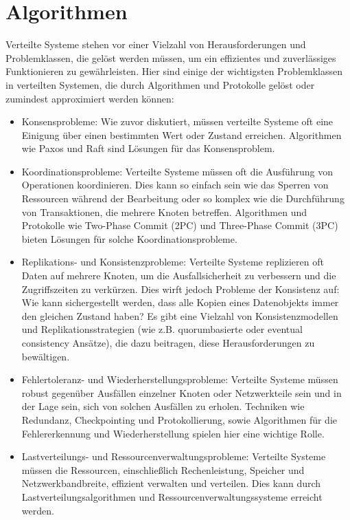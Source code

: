 \section{Algorithmen}

Verteilte Systeme stehen vor einer Vielzahl von Herausforderungen und Problemklassen, die gelöst werden müssen, um ein effizientes und zuverlässiges Funktionieren zu gewährleisten. Hier sind einige der wichtigsten Problemklassen in verteilten Systemen, die durch Algorithmen und Protokolle gelöst oder zumindest approximiert werden können:
\begin{itemize}
\item Konsensprobleme: Wie zuvor diskutiert, müssen verteilte Systeme oft eine Einigung über einen bestimmten Wert oder Zustand erreichen. Algorithmen wie Paxos und Raft sind Lösungen für das Konsensproblem.

\item Koordinationsprobleme: Verteilte Systeme müssen oft die Ausführung von Operationen koordinieren. Dies kann so einfach sein wie das Sperren von Ressourcen während der Bearbeitung oder so komplex wie die Durchführung von Transaktionen, die mehrere Knoten betreffen. Algorithmen und Protokolle wie Two-Phase Commit (2PC) und Three-Phase Commit (3PC) bieten Lösungen für solche Koordinationsprobleme.

\item Replikations- und Konsistenzprobleme: Verteilte Systeme replizieren oft Daten auf mehrere Knoten, um die Ausfallsicherheit zu verbessern und die Zugriffszeiten zu verkürzen. Dies wirft jedoch Probleme der Konsistenz auf: Wie kann sichergestellt werden, dass alle Kopien eines Datenobjekts immer den gleichen Zustand haben? Es gibt eine Vielzahl von Konsistenzmodellen und Replikationsstrategien (wie z.B. quorumbasierte oder eventual consistency Ansätze), die dazu beitragen, diese Herausforderungen zu bewältigen.

\item Fehlertoleranz- und Wiederherstellungsprobleme: Verteilte Systeme müssen robust gegenüber Ausfällen einzelner Knoten oder Netzwerkteile sein und in der Lage sein, sich von solchen Ausfällen zu erholen. Techniken wie Redundanz, Checkpointing und Protokollierung, sowie Algorithmen für die Fehlererkennung und Wiederherstellung spielen hier eine wichtige Rolle.

\item Lastverteilungs- und Ressourcenverwaltungsprobleme: Verteilte Systeme müssen die Ressourcen, einschließlich Rechenleistung, Speicher und Netzwerkbandbreite, effizient verwalten und verteilen. Dies kann durch Lastverteilungsalgorithmen und Ressourcenverwaltungssysteme erreicht werden.
\end{itemize}

